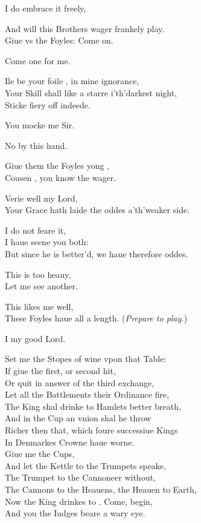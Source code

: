 \documentclass[a5paper,DIV=calc,11pt]{scrbook}
\begin{document}
\begin{drama*}
    \hamspeaks I do embrace it freely,
    
    And will this Brothers wager frankely play.\\
    Giue vs the Foyles: Come on.
    
    \laerspeaks Come one for me.
    
    \hamspeaks Ile be your foile \laer, in mine ignorance,\\
    Your Skill shall like a starre i'th'darkest night,\\
    Sticke fiery off indeede.
    
    \laerspeaks You mocke me Sir.
    
    \hamspeaks No by this hand.
    
    \kingspeaks Giue them the Foyles yong \osr,\\
    Cousen \ham, you know the wager.
    
    \hamspeaks Verie well my Lord,\\
    Your Grace hath laide the oddes a'th'weaker side.
    
    \kingspeaks I do not feare it,\\
    I haue seene you both:\\
    But since he is better'd, we haue therefore oddes.
    
    \laerspeaks This is too heauy,\\
    Let me see another.
    
    \hamspeaks This likes me well,\\
    These Foyles haue all a length. \hfill(\textit{Prepare to play.})
    
    \osrspeaks I my good Lord.
    
    \kingspeaks Set me the Stopes of wine vpon that Table:\\
    If \ham giue the first, or second hit,\\
    Or quit in answer of the third exchange,\\
    Let all the Battlements their Ordinance fire,\\
    The King shal drinke to Hamlets better breath,\\
    And in the Cup an vnion shal he throw\\
    Richer then that, which foure successiue Kings\\
    In Denmarkes Crowne haue worne.\\
    Giue me the Cups,\\
    And let the Kettle to the Trumpets speake,\\
    The Trumpet to the Cannoneer without,\\
    The Cannons to the Heauens, the Heauen to Earth,\\
    Now the King drinkes to \ham. Come, begin,\\
    And you the Iudges beare a wary eye.
    

\end{drama*}
\end{document}
